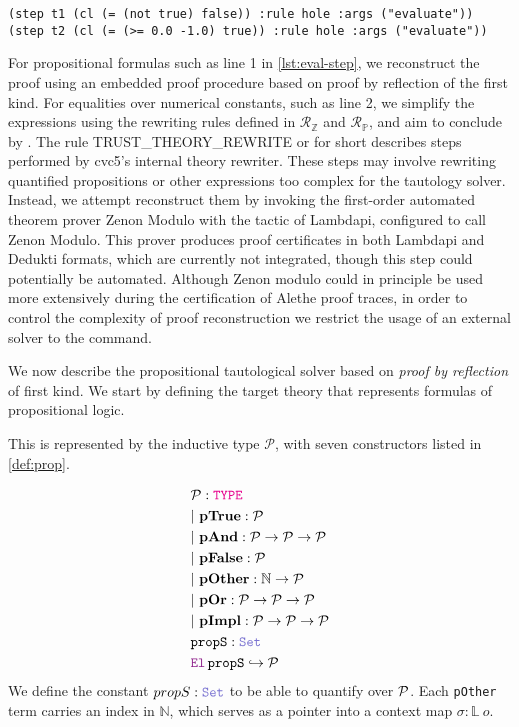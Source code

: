 \smallskip

\begin{lstlisting}[language=SMT,caption={An example of proof trace using the cvc5 $\kw{evaluate}$ rule.},label={lst:eval-step}]
(step t1 (cl (= (not true) false)) :rule hole :args ("evaluate"))
(step t2 (cl (= (>= 0.0 -1.0) true)) :rule hole :args ("evaluate"))
\end{lstlisting}

\smallskip

For propositional formulas such as line 1 in \cref{lst:eval-step}, we reconstruct the proof using an embedded proof procedure based on proof by reflection of the first kind.
For equalities over numerical constants, such as line 2, we simplify the expressions using the rewriting rules defined in $\mathcal{R}_{\mathbb{Z}}$ and $\mathcal{R}_{\mathbb{P}}$, and aim to conclude by .
The rule TRUST\_THEORY\_REWRITE or  for short describes steps performed by cvc5’s internal theory rewriter.
These steps may involve rewriting quantified propositions or other expressions too complex for the tautology solver.
Instead, we attempt reconstruct them by invoking the first-order automated theorem prover Zenon Modulo \cite{zenonmodulo} with the tactic  of Lambdapi, configured to call Zenon Modulo.
This prover produces proof certificates in both Lambdapi and Dedukti formats, which are currently not integrated,  though this step could potentially be automated.
Although Zenon modulo could in principle be used more extensively during the certification of Alethe proof traces, in order to control the complexity of proof reconstruction we restrict the usage of an external solver to the  command.

We now describe the propositional tautological solver based on \emph{proof by reflection} of first kind.
We start by defining the target theory that represents formulas of propositional logic.

\begin{definition}[$\cal{P}$]\label{def:prop}
This is represented by the inductive type $\mathcal{P}$, with seven constructors listed in \cref{def:prop}.

\begin{align*}
& \cal{P} : \type \\
& |~\textbf{pTrue} : \cal{P} \\
& |~\textbf{pAnd} : \cal{P} \ra \cal{P} \ra \cal{P} \\
& |~\textbf{pFalse} : \cal{P} \\
& |~\textbf{pOther} : \N \ra \cal{P} \\
& |~\textbf{pOr} : \cal{P} \ra \cal{P} \ra \cal{P} \\
& |~\textbf{pImpl} : \cal{P} \ra \cal{P} \ra \cal{P} \\
& \kw{propS}: \set \\
& \el\,\kw{propS} \re \cal{P}
\end{align*}
We define the constant $propS: \set$ to be able to quantify over $\cal{P}$.
Each \texttt{pOther} term carries an index in $\mathbb{N}$, which serves as a pointer into a context map $\sigma : \mathbb{L}~o$.
\end{definition}

